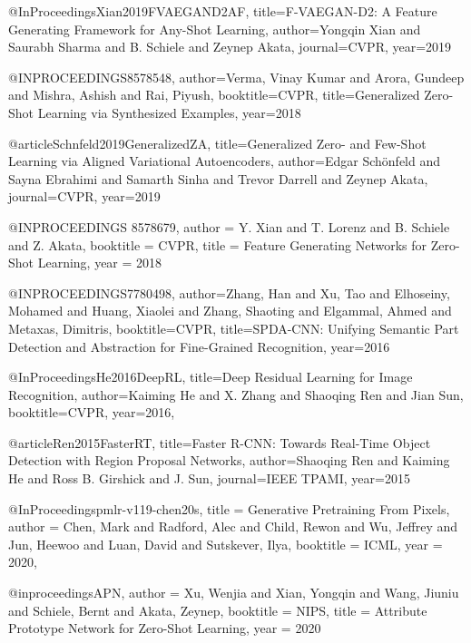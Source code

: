 @InProceedings{Xian2019FVAEGAND2AF,
  title={F-VAEGAN-D2: A Feature Generating Framework for Any-Shot Learning},
  author={Yongqin Xian and Saurabh Sharma and B. Schiele and Zeynep Akata},
  journal={CVPR},
  year={2019}
}

@INPROCEEDINGS{8578548,  author={Verma, Vinay Kumar and Arora, Gundeep and Mishra, Ashish and Rai, Piyush},  booktitle={CVPR},   title={Generalized Zero-Shot Learning via Synthesized Examples},   year={2018}}


@article{Schnfeld2019GeneralizedZA,
  title={Generalized Zero- and Few-Shot Learning via Aligned Variational Autoencoders},
  author={Edgar Sch{\"o}nfeld and Sayna Ebrahimi and Samarth Sinha and Trevor Darrell and Zeynep Akata},
  journal={CVPR},
  year={2019}
}



@INPROCEEDINGS {8578679,
author = {Y. Xian and T. Lorenz and B. Schiele and Z. Akata},
booktitle = {CVPR},
title = {Feature Generating Networks for Zero-Shot Learning},
year = {2018}
}



@INPROCEEDINGS{7780498,  author={Zhang, Han and Xu, Tao and Elhoseiny, Mohamed and Huang, Xiaolei and Zhang, Shaoting and Elgammal, Ahmed and Metaxas, Dimitris},  booktitle={CVPR},   title={SPDA-CNN: Unifying Semantic Part Detection and Abstraction for Fine-Grained Recognition},   year={2016}}



@InProceedings{He2016DeepRL,
  title={Deep Residual Learning for Image Recognition},
  author={Kaiming He and X. Zhang and Shaoqing Ren and Jian Sun},
  booktitle={CVPR},
  year={2016},
}



@article{Ren2015FasterRT,
  title={Faster R-CNN: Towards Real-Time Object Detection with Region Proposal Networks},
  author={Shaoqing Ren and Kaiming He and Ross B. Girshick and J. Sun},
  journal={IEEE TPAMI},
  year={2015}
}





@InProceedings{pmlr-v119-chen20s,
  title = 	 {Generative Pretraining From Pixels},
  author =       {Chen, Mark and Radford, Alec and Child, Rewon and Wu, Jeffrey and Jun, Heewoo and Luan, David and Sutskever, Ilya},
  booktitle = 	 {ICML},
  year = 	 {2020},
}



@inproceedings{APN,
 author = {Xu, Wenjia and Xian, Yongqin and Wang, Jiuniu and Schiele, Bernt and Akata, Zeynep},
 booktitle = {NIPS},
 title = {Attribute Prototype Network for Zero-Shot Learning},
 year = {2020}
}




